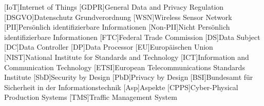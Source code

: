 

\begin{acronym}[DSGVO]

[IoT]{Internet of Things}
[GDPR]{General Data and Privacy Regulation}
[DSGVO]{Datenschutz Grundverordnung}
[WSN]{Wireless Sensor Network}
[PII]{Persönlich identifizierbare Informationen}
[Non-PII]{Nicht Persönlich identifizierbare Informationen}
[FTC]{Federal Trade Commission}
[DS]{Data Subject}
[DC]{Data Controller}
[DP]{Data Processor}
[EU]{Europäischen Union}
[NIST]{National Institute for Standards and Technology}
[ICT]{Information and Communication Technology}
[ETSI]{European Telecommunications Standards Institute}
[SbD]{Security by Design}
[PbD]{Privacy by Design}
[BSI]{Bundesamt für Sicherheit in der Informationstechnik}
[Asp]{Aspekte}
[CPPS]{Cyber-Physical Production Systems}
[TMS]{Traffic Management System}

\end{acronym}